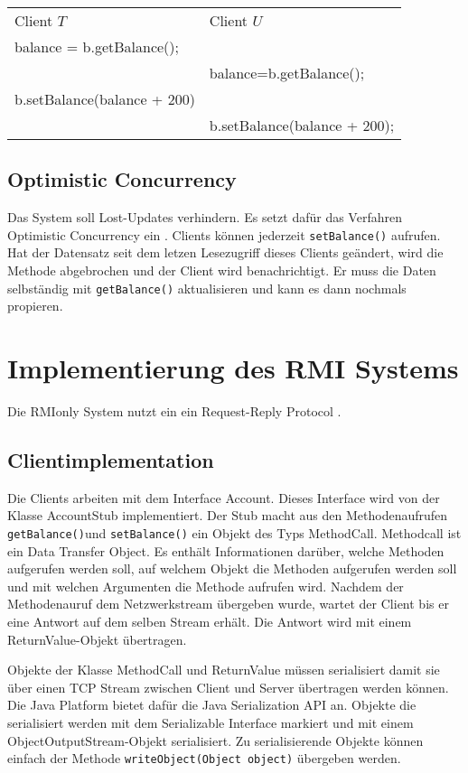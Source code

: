 \begin{tabular}{l l}
  Client $T$ & Client $U$ \\
balance = b.getBalance(); &  \\
 & balance=b.getBalance();  \\
b.setBalance(balance + 200) & \\
& b.setBalance(balance + 200);  \\
\end{tabular}

\subsection{Optimistic Concurrency}
\label{sec:optim-conc}

Das System soll Lost-Updates verhindern. Es setzt dafür das Verfahren
Optimistic Concurrency ein \cite{wiki:optimistic-concurrency}. Clients
können jederzeit \verb|setBalance()| aufrufen. Hat der Datensatz seit
dem letzen Lesezugriff dieses Clients geändert, wird die Methode
abgebrochen und der Client wird benachrichtigt. Er muss die Daten
selbständig mit \verb|getBalance()| aktualisieren und kann es dann
nochmals propieren.

\section{Implementierung des RMI Systems}
\label{sec:impl-des-eigen}

Die RMIonly System nutzt ein ein Request-Reply Protocol
\cite{coulouris88}.

\subsection{Clientimplementation}
\label{sec:clientimplementation}

Die Clients arbeiten mit dem Interface Account. Dieses Interface wird
von der Klasse AccountStub implementiert. Der Stub macht aus den
Methodenaufrufen
\verb|getBalance()|und \verb|setBalance()| ein Objekt des Typs
MethodCall. Methodcall ist ein Data Transfer Object. Es enthält
Informationen darüber, welche Methoden aufgerufen werden soll, auf
welchem Objekt die Methoden aufgerufen werden soll und mit welchen
Argumenten die Methode aufrufen wird. Nachdem der Methodenauruf dem
Netzwerkstream übergeben wurde, wartet der Client bis er eine Antwort
auf dem selben Stream erhält. Die Antwort wird mit einem
ReturnValue-Objekt übertragen.

Objekte der Klasse MethodCall und ReturnValue müssen serialisiert
da\-mit sie über einen TCP Stream zwischen Client und Server übertragen
werden können. Die Java Platform bietet dafür die Java Serialization
API an. Objekte die serialisiert werden mit dem Serializable Interface
markiert und mit einem ObjectOutputStream-Objekt serialisiert. Zu
serialisierende Objekte können einfach der Methode
\verb|writeObject(Object object)| übergeben werden.

